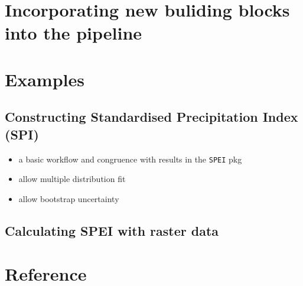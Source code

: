 \documentclass[
  letterpaper,
  DIV=11,
  numbers=noendperiod]{scrartcl}
\providecommand{\tightlist}{%
  \setlength{\itemsep}{0pt}\setlength{\parskip}{0pt}}\usepackage{longtable,booktabs,array}
\begin{document}
\hypertarget{sec-incorporating-new-buliding-blocks-into-the-pipeline}{%
\section{Incorporating new buliding blocks into the
pipeline}\label{sec-incorporating-new-buliding-blocks-into-the-pipeline}}

\hypertarget{sec-examples}{%
\section{Examples}\label{sec-examples}}

\hypertarget{constructing-standardised-precipitation-index-spi}{%
\subsection{Constructing Standardised Precipitation Index
(SPI)}\label{constructing-standardised-precipitation-index-spi}}

\begin{itemize}
\tightlist
\item
  a basic workflow and congruence with results in the \texttt{SPEI} pkg
\item
  allow multiple distribution fit
\item
  allow bootstrap uncertainty
\end{itemize}

\hypertarget{calculating-spei-with-raster-data}{%
\subsection{Calculating SPEI with raster
data}\label{calculating-spei-with-raster-data}}

\hypertarget{reference}{%
\section*{Reference}\label{reference}}
\end{document}
